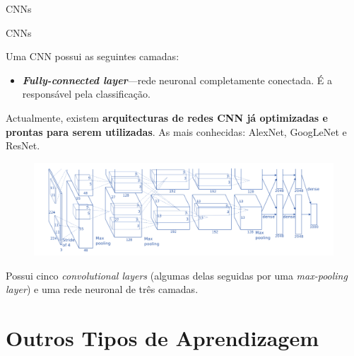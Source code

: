 \begin{frame}{CNNs \cont}

\end{frame}

\begin{frame}{CNNs \cont}

    Uma CNN possui as seguintes camadas:
    \begin{itemize}
    \item \textit{\textbf{Fully-connected layer}}---rede neuronal completamente conectada. É a responsável pela classificação.
\end{itemize}

\pauseskip

Actualmente, existem \textbf{arquitecturas de redes CNN já optimizadas e prontas para serem utilizadas}. As mais conhecidas: AlexNet, GoogLeNet e ResNet.

\pause


\begin{figure}
        \centering
    \includegraphics[width=.5\textwidth]{img/alexnet.png}
\end{figure}

Possui cinco \textit{convolutional layers} (algumas delas seguidas por uma \textit{max-pooling layer}) e uma rede neuronal de três camadas.

\end{frame}

\section{Outros Tipos de Aprendizagem}

